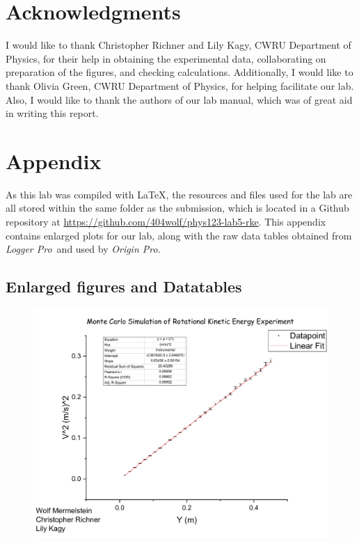 \documentclass[coverpage]{article}
\newcommand{\softwareText}[1]{\textit{#1}\texttrademark}
\newcommand{\loggerpro}{\softwareText{Logger Pro}}
\newcommand{\origin}{\softwareText{Origin Pro}}
\begin{document}
	\section*{Acknowledgments}
	I would like to thank Christopher Richner and Lily Kagy, CWRU Department of Physics, for their help in obtaining the experimental data, collaborating on preparation of the figures, and checking calculations. Additionally, I would like to thank Olivia Green, CWRU Department of Physics, for helping facilitate our lab. Also, I would like to thank the authors of our lab manual, which was of great aid in writing this report.
	
	
	\nocite{textbook}
	\nocite{labManual}
	
	
	\onecolumn
	
	\section{Appendix} \label{sect:appendix}
		
	As this lab was compiled with \LaTeX, the resources and files used for the lab are all stored within the same folder as the submission, which is located in a Github repository at \url{https://github.com/404wolf/phys123-lab5-rke}. This appendix contains enlarged plots for our lab, along with the raw data tables obtained from \loggerpro~and used by \origin.
		
	\subsection{Enlarged figures and Datatables}
	
	\begin{figure}[h]
		\centering
		\includegraphics[width=6in]{plots/monteCarloPlot.pdf}
	\end{figure}
		
\end{document}
